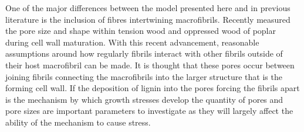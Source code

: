 One of the major differences between the model presented here and in previous
literature is the inclusion of fibres intertwining macrofibrils. Recently \cite{Chang_2014} measured the pore size and shape within tension wood and oppressed
wood of poplar during cell wall maturation. With this recent advancement,
reasonable assumptions around how regularly fibrils interact with other fibrils
outside of their host macrofibril can be made. It is thought that these pores
occur between joining fibrils connecting the macrofibrils into the larger
structure that is the forming cell wall. If the deposition of lignin into the
pores forcing the fibrils apart is the mechanism by which growth stresses
develop the quantity of pores and pore sizes are important parameters to
investigate as they will largely affect the ability of the mechanism to cause
stress.